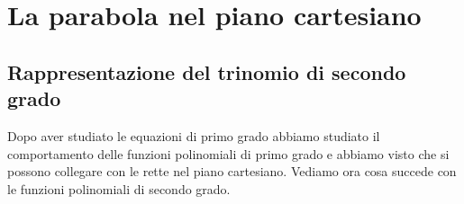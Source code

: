 


\chapter{La parabola nel piano cartesiano}

% 
% 
% 
% 
% 
% 
% 
% 
% 
% 
% 
% 

\section{Rappresentazione del trinomio di secondo grado}
\label{sec:parabola_rappresentazionetrinomio}

Dopo aver studiato le equazioni di primo grado abbiamo studiato il 
comportamento delle funzioni polinomiali di primo grado e abbiamo visto che 
si possono collegare con le rette nel piano cartesiano. 
Vediamo ora cosa succede con le funzioni polinomiali di secondo grado. 

